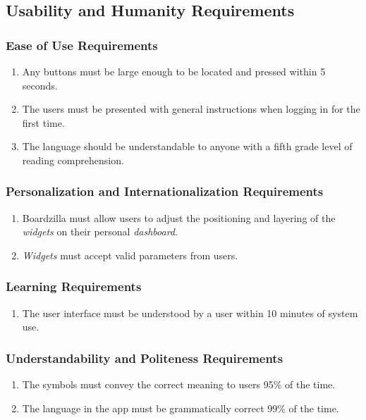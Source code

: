 \documentclass{article}
\begin{document}

\subsection{Usability and Humanity Requirements}
\label{sub:usability_and_humanity_requirements}

\subsubsection{Ease of Use Requirements}
\label{ssub:ease_of_use_requirements}
\begin{enumerate}[{UH}1. ]
    \item Any buttons must be large enough to be located and pressed within 5 seconds.
	\item The users must be presented with general instructions when logging in for the first time.
	\item The language should be understandable to anyone with a fifth grade level of reading comprehension.
\end{enumerate}

\subsubsection{Personalization and Internationalization Requirements}
\label{ssub:personalization_and_internationalization_requirements}
\begin{enumerate}[{UH}1. ]
	\item Boardzilla must allow users to adjust the positioning and layering of the \textit{widgets} on their personal \textit{dashboard}.
	\item \textit{Widgets} must accept valid parameters from users.
\end{enumerate}

\subsubsection{Learning Requirements}
\label{ssub:learning_requirements}
\begin{enumerate}[{UH}1. ]
	\item The user interface must be understood by a user within 10 minutes of system use.
\end{enumerate}

\subsubsection{Understandability and Politeness Requirements}
\label{ssub:understandability_and_politeness_requirements}
\begin{enumerate}[{UH}1. ]
	\item The symbols must convey the correct meaning to users 95\% of the time.
	\item The language in the app must be grammatically correct 99\% of the time.
\end{enumerate}
\end{document}
